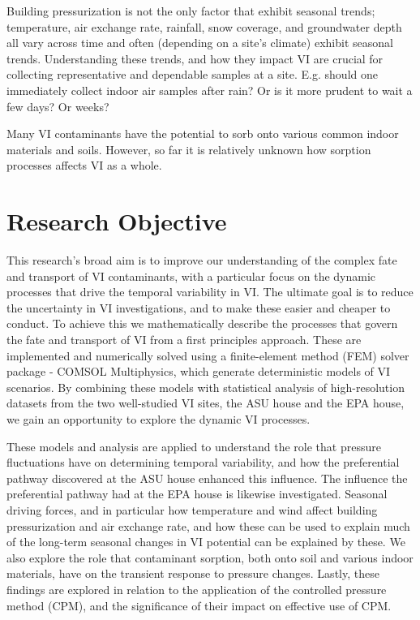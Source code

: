 \documentclass[../thesis.tex]{subfiles}
\begin{document}
Building pressurization is not the only factor that exhibit seasonal trends; temperature, air exchange rate, rainfall, snow coverage, and groundwater depth all vary across time and often (depending on a site's climate) exhibit seasonal trends.
Understanding these trends, and how they impact VI are crucial for collecting representative and dependable samples at a site.
E.g. should one immediately collect indoor air samples after rain? Or is it more prudent to wait a few days? Or weeks? \par

Many VI contaminants have the potential to sorb onto various common indoor materials and soils.
However, so far it is relatively unknown how sorption processes affects VI as a whole.


\section{Research Objective}

This research's broad aim is to improve our understanding of the complex fate and transport of VI contaminants, with a particular focus on the dynamic processes that drive the temporal variability in VI.
The ultimate goal is to reduce the uncertainty in VI investigations, and to make these easier and cheaper to conduct.
To achieve this we mathematically describe the processes that govern the fate and transport of VI from a first principles approach.
These are implemented and numerically solved using a finite-element method (FEM) solver package - COMSOL Multiphysics, which generate deterministic models of VI scenarios.
By combining these models with statistical analysis of high-resolution datasets from the two well-studied VI sites, the ASU house and the EPA house, we gain an opportunity to explore the dynamic VI processes.\par

These models and analysis are applied to understand the role that pressure fluctuations have on determining temporal variability, and how the preferential pathway discovered at the ASU house enhanced this influence.
The influence the preferential pathway had at the EPA house is likewise investigated.
Seasonal driving forces, and in particular how temperature and wind affect building pressurization and air exchange rate, and how these can be used to explain much of the long-term seasonal changes in VI potential can be explained by these.
We also explore the role that contaminant sorption, both onto soil and various indoor materials, have on the transient response to pressure changes.
Lastly, these findings are explored in relation to the application of the controlled pressure method (CPM), and the significance of their impact on effective use of CPM.\par
\end{document}
